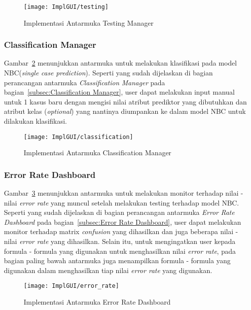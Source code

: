 \begin{figure}[H]
	\centering
	\texttt{[image: ImplGUI/testing]}
	\caption[Implementasi Antarmuka Testing Manager]{Implementasi Antarmuka Testing Manager}
	\label{fig:Implementasi Antarmuka Testing Manager}
\end{figure}

\subsubsection{Classification Manager}
Gambar~\ref{fig:Implementasi Antarmuka Classification Manager} menunjukkan antarmuka untuk melakukan klasifikasi pada model NBC(\textit{single case prediction}). Seperti yang sudah dijelaskan di bagian perancangan antarmuka \textit{Classification Manager} pada bagian~\ref{subsec:Classification Manager}, user dapat melakukan input manual untuk 1 kasus baru dengan mengisi nilai atribut prediktor yang dibutuhkan dan atribut kelas (\textit{optional}) yang nantinya diumpankan ke dalam model NBC untuk dilakukan klasifikasi.

\begin{figure}[H]
	\centering
	\texttt{[image: ImplGUI/classification]}
	\caption[Implementasi Antarmuka Classification Manager]{Implementasi Antarmuka Classification Manager}
	\label{fig:Implementasi Antarmuka Classification Manager}
\end{figure}

\subsubsection{Error Rate Dashboard}
Gambar~\ref{fig:Implementasi Antarmuka Error Rate Dashboard} menunjukkan antarmuka untuk melakukan monitor terhadap nilai - nilai \textit{error rate} yang muncul setelah melakukan testing terhadap model NBC. Seperti yang sudah dijelaskan di bagian perancangan antarmuka \textit{Error Rate Dashboard} pada bagian~\ref{subsec:Error Rate Dashboard}, user dapat melakukan monitor terhadap matrix \textit{confusion} yang dihasilkan dan juga beberapa nilai - nilai \textit{error rate} yang dihasilkan. Selain itu, untuk mengingatkan user kepada formula - formula yang digunakan untuk menghasilkan nilai \textit{error rate}, pada bagian paling bawah antarmuka juga menampilkan formula - formula yang digunakan dalam menghasilkan tiap nilai \textit{error rate} yang digunakan. 

\begin{figure}[H]
	\centering
	\texttt{[image: ImplGUI/error\_rate]}
	\caption[Implementasi Antarmuka Error Rate Dashboard]{Implementasi Antarmuka Error Rate Dashboard}
	\label{fig:Implementasi Antarmuka Error Rate Dashboard}
\end{figure}

